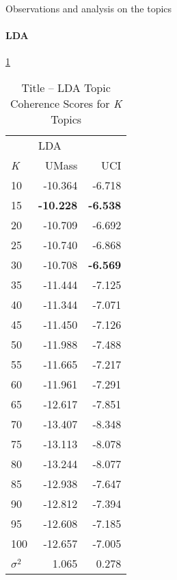 \documentclass[letterpaper,12pt]{article}
\begin{document}
Observations and analysis on the topics
\newpage
\paragraph{LDA}
\ref{tab:lda_title_tc}
\begin{table}
	\caption{\label{tab:lda_title_tc} Title -- LDA Topic Coherence Scores for \emph{K} Topics}
	\begin{center}
		\begin{tabular}{lrr}
			\toprule
			{} & \multicolumn{2}{l}{LDA} \\
			\emph{K} &   UMass &    UCI \\
			\midrule
			10  & -10.364 & -6.718 \\
			15  & \textbf{-10.228} & \textbf{-6.538} \\
			20  & -10.709 & -6.692 \\
			25  & -10.740 & -6.868 \\
			30  & -10.708 & \textbf{-6.569} \\
			35  & -11.444 & -7.125 \\
			40  & -11.344 & -7.071 \\
			45  & -11.450 & -7.126 \\
			50  & -11.988 & -7.488 \\
			55  & -11.665 & -7.217 \\
			60  & -11.961 & -7.291 \\
			65  & -12.617 & -7.851 \\
			70  & -13.407 & -8.348 \\
			75  & -13.113 & -8.078 \\
			80  & -13.244 & -8.077 \\
			85  & -12.938 & -7.647 \\
			90  & -12.812 & -7.394 \\
			95  & -12.608 & -7.185 \\
			100 & -12.657 & -7.005 \\
			\midrule
			$\sigma^2$ & 1.065 & 0.278 \\
			\bottomrule
			\end{tabular}
	\end{center}
\end{table}
\end{document}
